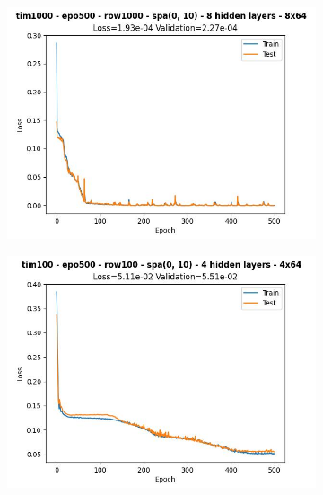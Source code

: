 \begin{figure}[H]
\begin{subfigure}{.47\linewidth}
        \includegraphics[width=\textwidth]{other-models/2024-05-25T10:42:37.365880_pendulum_tim1000_epo500_row1000_spa(0, 10).jpg}
    \end{subfigure}
    \begin{subfigure}{.47\linewidth}
        \centering
        \includegraphics[width=\textwidth]{other-models/2024-05-25T10:41:16.718081_pendulum_tim100_epo500_row100_spa(0, 10).jpg}
    \end{subfigure}
\end{figure}
